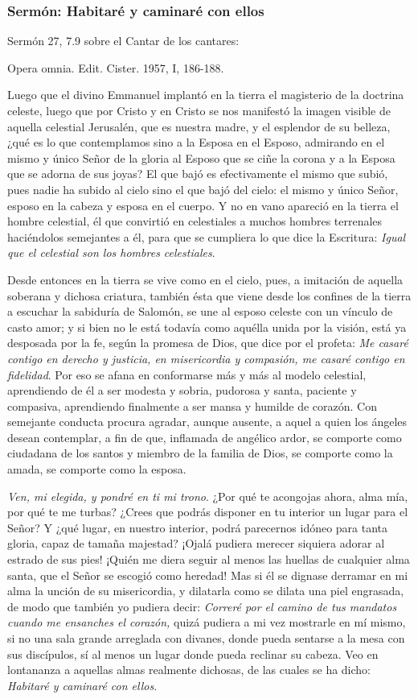 \subsubsection{Sermón: Habitaré y caminaré con ellos}

Sermón 27, 7.9 sobre el Cantar de los cantares:

Opera omnia. Edit. Cister. 1957, I, 186-188.

Luego que el divino Emmanuel implantó en la tierra el magisterio de la doctrina celeste, luego que por Cristo y en Cristo se nos manifestó la imagen visible de aquella celestial Jerusalén, que es nuestra madre, y el esplendor de su belleza, ¿qué es lo que contemplamos sino a la Esposa en el Esposo, admirando en el mismo y único Señor de la gloria al Esposo que se ciñe la corona y a la Esposa que se adorna de sus joyas? El que bajó es efectivamente el mismo que subió, pues nadie ha subido al cielo sino el que bajó del cielo: el mismo y único Señor, esposo en la cabeza y esposa en el cuerpo. Y no en vano apareció en la tierra el hombre celestial, él que convirtió en celestiales a muchos hombres terrenales haciéndolos semejantes a él, para que se cumpliera lo que dice la Escritura: \emph{Igual que el celestial son los hombres celestiales}.

Desde entonces en la tierra se vive como en el cielo, pues, a imitación de aquella soberana y dichosa criatura, también ésta que viene desde los confines de la tierra a escuchar la sabiduría de Salomón, se une al esposo celeste con un vínculo de casto amor; y si bien no le está todavía como aquélla unida por la visión, está ya desposada por la fe, según la promesa de Dios, que dice por el profeta: \emph{Me casaré contigo en derecho y justicia, en misericordia y compasión, me casaré contigo en fidelidad}. Por eso se afana en conformarse más y más al modelo celestial, aprendiendo de él a ser modesta y sobria, pudorosa y santa, paciente y compasiva, aprendiendo finalmente a ser mansa y humilde de corazón. Con semejante conducta procura agradar, aunque ausente, a aquel a quien los ángeles desean contemplar, a fin de que, inflamada de angélico ardor, se comporte como ciudadana de los santos y miembro de la familia de Dios, se comporte como la amada, se comporte como la esposa.

\emph{Ven, mi elegida, y pondré en ti mi trono}. ¿Por qué te acongojas ahora, alma mía, por qué te me turbas? ¿Crees que podrás disponer en tu interior un lugar para el Señor? Y ¿qué lugar, en nuestro interior, podrá parecernos idóneo para tanta gloria, capaz de tamaña majestad? ¡Ojalá pudiera merecer siquiera adorar al estrado de sus pies! ¡Quién me diera seguir al menos las huellas de cualquier alma santa, que el Señor se escogió como heredad! Mas si él se dignase derramar en mi alma la unción de su misericordia, y dilatarla como se dilata una piel engrasada, de modo que también yo pudiera decir: \emph{Correré por el camino de tus mandatos cuando me ensanches el corazón,} quizá pudiera a mi vez mostrarle en mí mismo, si no una sala grande arreglada con divanes, donde pueda sentarse a la mesa con sus discípulos, sí al menos un lugar donde pueda reclinar su cabeza. Veo en lontananza a aquellas almas realmente dichosas, de las cuales se ha dicho: \emph{Habitaré y caminaré con ellos}.

